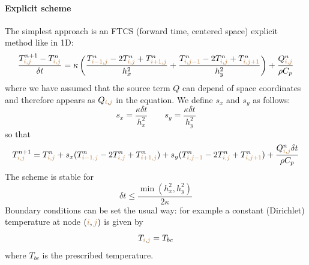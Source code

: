 \paragraph{Explicit scheme} The simplest approach is an {\color{olive} FTCS} 
(forward time, centered space) explicit method like in 1D:
\begin{equation}
\frac{T_{{\color{brown}i,j}}^{n+1}-T_{{\color{brown}i,j}}^n}{\delta t}
= \kappa
\left(
\frac{ T_{{\color{brown}i-1,j}}^{n}-2T_{{\color{brown}i,j}}^{n}+T_{{\color{brown}i+1,j}}^{n}  }{h_x^2} + 
\frac{ T_{{\color{brown}i,j-1}}^{n}-2T_{{\color{brown}i,j}}^{n}+T_{{\color{brown}i,j+1}}^{n}  }{h_y^2}
\right)
+\frac{Q_{{\color{brown}i,j}}^n}{\rho C_p}
\end{equation}
where we have assumed that the source term $Q$ can depend of space coordinates and therefore 
appears as $Q_{{\color{brown}i},{\color{brown}j}}$ in the equation.
We define $s_x$ and $s_y$ as follows:
\begin{equation}
s_x = \frac{\kappa \delta t}{h_x^2}
\quad\quad
s_y = \frac{\kappa \delta t}{h_y^2}
\end{equation}
so that
\begin{equation}
T_{{\color{brown}i,j}}^{n+1} = T_{{\color{brown}i,j}}^n 
+ s_x ( T_{{\color{brown}i-1,j}}^{n}
-2T_{{\color{brown}i,j}}^{n}
+T_{{\color{brown}i+1,j}}^{n} ) 
+s_y ( T_{{\color{brown}i,j-1}}^{n}
-2T_{{\color{brown}i,j}}^{n}
+T_{{\color{brown}i,j+1}}^{n} ) + 
\frac{Q_{{\color{brown}i,j}}^n \delta t}{\rho C_p}
\end{equation}
The scheme is stable for  
\begin{equation}
\delta t \leq \frac{\min(h_x^2,h_y^2)}{2 \kappa}
\end{equation}
Boundary conditions can be set the usual way: for example a constant (Dirichlet) temperature 
at node $({\color{brown}i},{\color{brown}j})$ is given by
\begin{equation}
T_{{\color{brown}i},{\color{brown}j}}=T_{bc} 
\end{equation}
where $T_{bc}$ is the prescribed temperature. 

